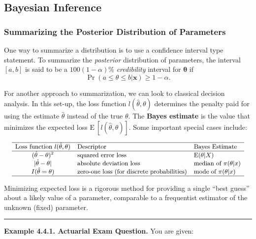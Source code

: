 \documentclass[]{book}
\theoremstyle{definition}
\theoremstyle{definition}
\theoremstyle{definition}
\theoremstyle{remark}
\begin{document}
\subsection{Bayesian Inference}\label{bayesian-inference}

\subsubsection{Summarizing the Posterior Distribution of
Parameters}\label{summarizing-the-posterior-distribution-of-parameters}

One way to summarize a distribution is to use a confidence interval type
statement. To summarize the \emph{posterior} distribution of parameters,
the interval \([a,b]\) is said to be a \(100(1-\alpha)\%\)
\emph{credibility} interval for \(\boldsymbol \theta\) if
\[\Pr (a \le \theta \le b | \mathbf{x}) \ge 1- \alpha.\]

For another approach to summarization, we can look to classical decision
analysis. In this set-up, the loss function \(l(\hat{\theta}, \theta)\)
determines the penalty paid for using the estimate \(\hat{\theta}\)
instead of the true \(\theta\). The \textbf{Bayes estimate} is the value
that minimizes the expected loss
\(\mathrm{E~}[ l(\hat{\theta}, \theta)]\). Some important special cases
include:

\[
{\small
\begin{array}{cll}
\hline
\text{Loss function } l(\hat{\theta}, \theta) & \text{Descriptor} & \text{Bayes Estimate} \\
\hline 
(\hat{\theta}- \theta)^2 & \text{squared error loss} & \mathrm{E}(\theta|X) \\
|\hat{\theta}- \theta| & \text{absolute deviation loss} & \text{median of } \pi(\theta|x) \\
I(\hat{\theta} =\theta) & \text{zero-one loss (for discrete probabilities)} & \text{mode of } \pi(\theta|x) \\
\hline
\end{array}
}
\]

Minimizing expected loss is a rigorous method for providing a single
``best guess'' about a likely value of a parameter, comparable to a
frequentist estimator of the unknown (fixed) parameter.

\begin{center}\rule{0.5\linewidth}{\linethickness}\end{center}

\textbf{Example 4.4.1. Actuarial Exam Question.} You are given:
\end{document}
